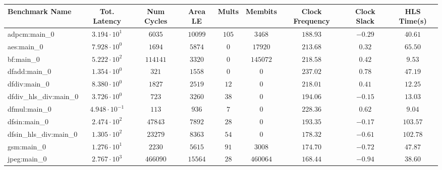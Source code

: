 \begin{tabular}{|l|c|c|c|c|c|c|c|c|}
\hline
Benchmark Name          & Tot. Latency            & Num Cycles & Area LE   & Mults   & Membits    & Clock Frequency & Clock Slack & HLS Time(s) \\
\hline
adpcm:main\_0           & $ 3.194 \cdot 10^{1}  $ & $ 6035   $ & $ 10099 $ & $ 105 $ & $ 3468   $ & $ 188.93      $ & $ -0.29   $ & $ 40.61   $ \\
aes:main\_0             & $ 7.928 \cdot 10^{0}  $ & $ 1694   $ & $ 5874  $ & $ 0   $ & $ 17920  $ & $ 213.68      $ & $ 0.32    $ & $ 65.50   $ \\
bf:main\_0              & $ 5.222 \cdot 10^{2}  $ & $ 114141 $ & $ 3320  $ & $ 0   $ & $ 145072 $ & $ 218.58      $ & $ 0.42    $ & $ 9.53    $ \\
dfadd:main\_0           & $ 1.354 \cdot 10^{0}  $ & $ 321    $ & $ 1558  $ & $ 0   $ & $ 0      $ & $ 237.02      $ & $ 0.78    $ & $ 47.19   $ \\
dfdiv:main\_0           & $ 8.380 \cdot 10^{0}  $ & $ 1827   $ & $ 2519  $ & $ 12  $ & $ 0      $ & $ 218.01      $ & $ 0.41    $ & $ 12.25   $ \\
dfdiv\_hls\_div:main\_0 & $ 3.726 \cdot 10^{0}  $ & $ 723    $ & $ 3260  $ & $ 38  $ & $ 0      $ & $ 194.06      $ & $ -0.15   $ & $ 13.03   $ \\
dfmul:main\_0           & $ 4.948 \cdot 10^{-1} $ & $ 113    $ & $ 936   $ & $ 7   $ & $ 0      $ & $ 228.36      $ & $ 0.62    $ & $ 9.04    $ \\
dfsin:main\_0           & $ 2.474 \cdot 10^{2}  $ & $ 47843  $ & $ 7892  $ & $ 28  $ & $ 0      $ & $ 193.35      $ & $ -0.17   $ & $ 103.57  $ \\
dfsin\_hls\_div:main\_0 & $ 1.305 \cdot 10^{2}  $ & $ 23279  $ & $ 8363  $ & $ 54  $ & $ 0      $ & $ 178.32      $ & $ -0.61   $ & $ 102.78  $ \\
gsm:main\_0             & $ 1.276 \cdot 10^{1}  $ & $ 2230   $ & $ 5615  $ & $ 91  $ & $ 3008   $ & $ 174.70      $ & $ -0.72   $ & $ 47.87   $ \\
jpeg:main\_0            & $ 2.767 \cdot 10^{3}  $ & $ 466090 $ & $ 15564 $ & $ 28  $ & $ 460064 $ & $ 168.44      $ & $ -0.94   $ & $ 38.60   $ \\

\end{tabular}
